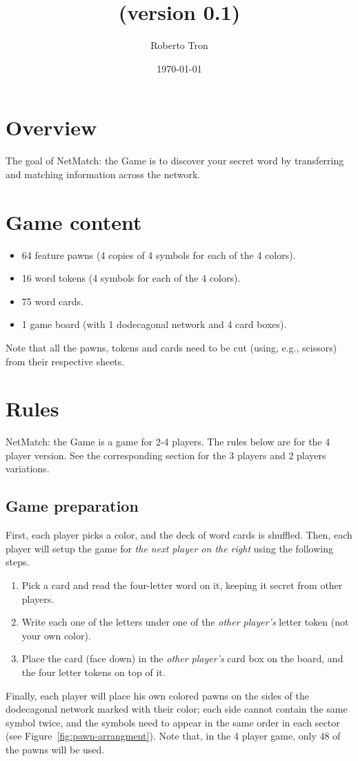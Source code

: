 \documentclass[12pt]{article}
\title{\gamename{}  (version 0.1)}
\author{Roberto Tron}
\date{\today}
\newcommand{\gamename}{{\sffamily NetMatch: the Game}}
\begin{document}
\pagestyle{empty}

\maketitle

\section*{Overview}
The goal of \gamename{} is to discover your secret word by transferring and matching information across the network.
\section*{Game content}
\begin{itemize}
\item 64 feature pawns (4 copies of 4 symbols for each of the  4 colors).
\item 16 word tokens (4 symbols for each of the 4 colors).
\item 75 word cards.
\item 1 game board (with 1 dodecagonal network and 4 card boxes).
\end{itemize}
Note that all the pawns, tokens and cards need to be cut (using, e.g., scissors) from their respective sheets.

\section*{Rules}
\gamename{} is a game for 2-4 players. The rules below are for the 4 player version. See the corresponding section for the 3 players and 2 players variations.
\subsection*{Game preparation}
First, each player picks a color, and the deck of word cards is shuffled. Then, each player will setup the game for \emph{the next player on the right} using the following steps.
\begin{enumerate}
\item Pick a card and read the four-letter word on it, keeping it secret from other players.
\item Write each one of the letters under one of the \emph{other player's} letter token (not your own color).
\item Place the card (face down) in the \emph{other player's} card box on the board, and the four letter tokens on top of it.
\end{enumerate}
Finally, each player will place his own colored pawns on the sides of the dodecagonal network marked with their color; each side cannot contain the same symbol twice, and the symbols need to appear in the same order in each sector (see Figure~\ref{fig:pawn-arrangment}). Note that, in the 4 player game, only 48 of the pawns will be used.
\end{document}
